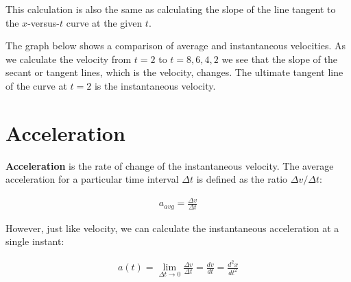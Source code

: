 \documentclass[11pt]{report}
\begin{document}
This calculation is also the same as calculating the slope of the line tangent to the $x$-versus-$t$ curve at the given $t$. 

The graph below shows a comparison of average and instantaneous velocities. As we calculate the velocity from $t = 2$ to $t = 8,6,4,2$ we see that the slope of the secant or tangent lines, which is the velocity, changes. The ultimate tangent line of the curve at $t = 2$ is the instantaneous velocity.

\begin{center}
\end{center}

\section{Acceleration}

\textbf{Acceleration} is the rate of change of the instantaneous velocity. The average acceleration for a particular time interval $\Delta t$ is defined as the ratio $\Delta v / \Delta t$:

\begin{align*}
    a_{avg} = \frac{\Delta v}{\Delta t}
\end{align*}

However, just like velocity, we can calculate the instantaneous acceleration at a single instant:

\begin{align*}
    a(t) = \lim_{\Delta t \to 0}\frac{\Delta v}{\Delta t} = \frac{dv}{dt} = \frac{d^{2}x}{dt^{2}}
\end{align*}
\end{document}
